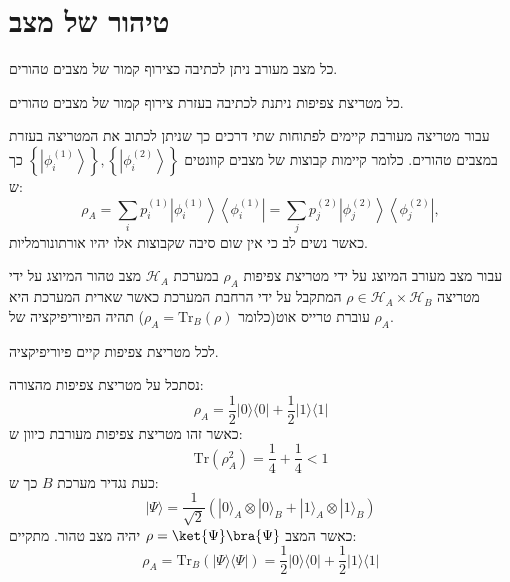 \documentclass{tstextbook}
\begin{document}
\section{טיהור של מצב}

\begin{reminder}
כל מצב מעורב ניתן לכתיבה כצירוף קמור של מצבים טהורים.

\end{reminder}
\begin{proposition}
כל מטריצת צפיפות ניתנת לכתיבה בעזרת צירוף קמור של מצבים טהורים.

\end{proposition}
\begin{proposition}
עבור מטריצה מעורבת קיימים לפתוחות שתי דרכים כך שניתן לכתוב את המטריצה בעזרת במצבים טהורים. כלומר קיימות קבוצות של מצבים קוונטים \(\left\{\left|\phi_{i}^{(1)}\right\rangle\right\},\left\{\left|\phi_{i}^{(2)}\right\rangle\right\}\) כך ש:
$$\rho_{A}=\sum_{i}p_{i}^{(1)}\left|\phi_{i}^{(1)}\right\rangle\left\langle\phi_{i}^{(1)}\right|=\sum_{j}p_{j}^{(2)}\left|\phi_{j}^{(2)}\right\rangle\left\langle\phi_{j}^{(2)}\right|,$$
כאשר נשים לב כי אין שום סיבה שקבוצות אלו יהיו אורתונורמליות.

\end{proposition}
\begin{definition}
עבור מצב מעורב המיוצג על ידי מטריצת צפיפות \(\rho_{A}\) במערכת \(\mathcal{H}_{A}\) מצב טהור המיוצג על ידי מטריצה \(\rho \in \mathcal{H}_{A}\times \mathcal{H}_{B}\) המתקבל על ידי הרחבת המערכת כאשר שארית המערכת היא עוברת טרייס אוט(כלומר \(\rho_{A}=\mathrm{Tr}_{B}\left( \rho \right)\)) תהיה הפיוריפיקציה של \(\rho_{A}\).

\end{definition}
\begin{theorem}
לכל מטריצת צפיפות קיים פיוריפיקציה.

\end{theorem}
\begin{example}
נסתכל על מטריצת צפיפות מהצורה:
$$\rho_{A}=\frac{1}{2}|0\rangle\langle0|+\frac{1}{2}|1\rangle\langle 1|$$
כאשר זהו מטריצת צפיפות מעורבת כיוון ש:
$$\mathrm{Tr}\left( \rho_{A}^{2} \right) = \frac{1}{4}+\frac{1}{4}< 1$$
כעת נגדיר מערכת \(B\) כך ש:
$$|\Psi\rangle=\frac{1}{\sqrt{2}}(|0\rangle_{A}\otimes|0\rangle_{B}+|1\rangle_{A}\otimes|1\rangle_{B})$$
כאשר המצב \(\rho=\ket{\Psi}\bra{\Psi}\) יהיה מצב טהור. מתקיים:
$$\rho_{A}=\mathrm{Tr}_{B}(|\Psi\rangle\langle\Psi|)=\frac{1}{2}|0\rangle\langle0|+\frac{1}{2}|1\rangle\langle1|$$

\end{example}
\end{document}
